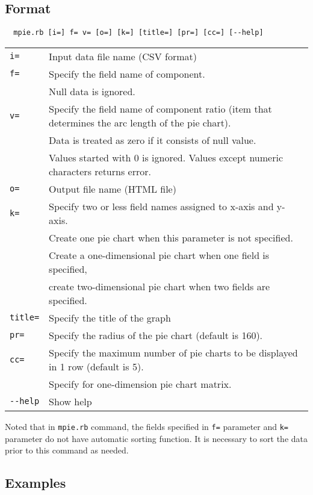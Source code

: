 \newpage
\subsection{Format}
\begin{verbatim}
  mpie.rb [i=] f= v= [o=] [k=] [title=] [pr=] [cc=] [--help]
\end{verbatim}

\begin{table}[htbp]
{\small
\begin{tabular}{ll}
\verb|i=|        & Input data file name  (CSV format) \\
\verb|f=|        & Specify the field name of component. \\
                 & Null data is ignored. \\
\verb|v=|        & Specify the field name of component ratio (item that determines the arc length of the pie chart).\\
                 & Data is treated as zero if it consists of null value.  \\
                 & Values started with 0 is ignored. Values except numeric characters returns error. \\
\verb|o=|        & Output file name (HTML file) \\
\verb|k=|        & Specify two or less field names assigned to x-axis and y-axis. \\
                 & Create one pie chart when this parameter is not specified. \\
                 & Create a one-dimensional pie chart when one field is specified, \\
                 & create two-dimensional pie chart when two fields are specified. \\
\verb|title=|    & Specify the title of the graph\\
\verb|pr=|       & Specify the radius of the pie chart (default is 160).  \\
\verb|cc=|       & Specify the maximum number of pie charts to be displayed in 1 row (default is 5). \\
                 & Specify for one-dimension pie chart matrix. \\
\verb|--help|    &  Show help \\
\end{tabular} 
}
\end{table} 

Noted that in \verb|mpie.rb| command, 
the fields specified in \verb|f=| parameter  and \verb|k=| parameter do not have automatic sorting function. 
It is necessary to sort the data prior to this command as needed. 

\subsection{Examples}


%

